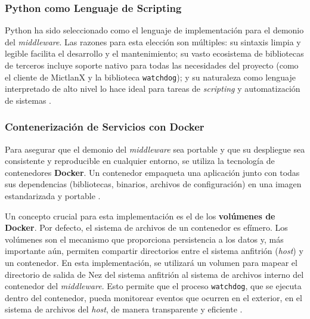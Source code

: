 \subsubsection{Python como Lenguaje de Scripting}
Python ha sido seleccionado como el lenguaje de implementación para el demonio del \textit{middleware}. Las razones para esta elección son múltiples: su sintaxis limpia y legible facilita el desarrollo y el mantenimiento; su vasto ecosistema de bibliotecas de terceros incluye soporte nativo para todas las necesidades del proyecto (como el cliente de MictlanX y la biblioteca \texttt{watchdog}); y su naturaleza como lenguaje interpretado de alto nivel lo hace ideal para tareas de \textit{scripting} y automatización de sistemas \cite{python2023docs, fowler2021refactoring}.

\subsubsection{Contenerización de Servicios con Docker}
Para asegurar que el demonio del \textit{middleware} sea portable y que su despliegue sea consistente y reproducible en cualquier entorno, se utiliza la tecnología de contenedores \textbf{Docker}. Un contenedor empaqueta una aplicación junto con todas sus dependencias (bibliotecas, binarios, archivos de configuración) en una imagen estandarizada y portable \cite{merkel2014docker}.
\par
Un concepto crucial para esta implementación es el de los \textbf{volúmenes de Docker}. Por defecto, el sistema de archivos de un contenedor es efímero. Los volúmenes son el mecanismo que proporciona persistencia a los datos y, más importante aún, permiten compartir directorios entre el sistema anfitrión (\textit{host}) y un contenedor. En esta implementación, se utilizará un volumen para mapear el directorio de salida de Nez del sistema anfitrión al sistema de archivos interno del contenedor del \textit{middleware}. Esto permite que el proceso \texttt{watchdog}, que se ejecuta dentro del contenedor, pueda monitorear eventos que ocurren en el exterior, en el sistema de archivos del \textit{host}, de manera transparente y eficiente \cite{poulton2020docker}.

